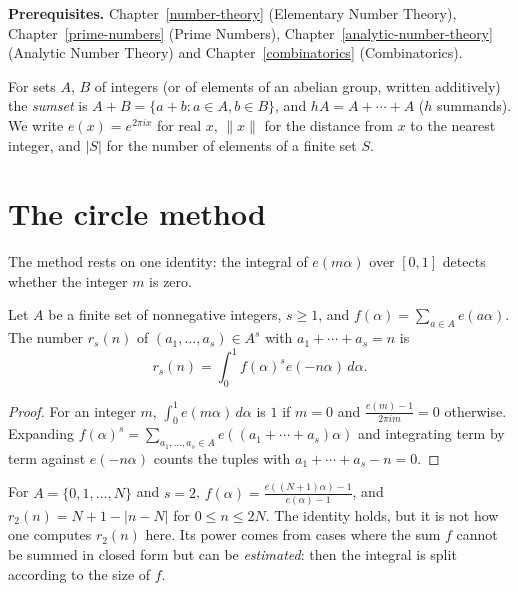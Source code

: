 \noindent\textbf{Prerequisites.} Chapter~\ref{number-theory} (Elementary Number Theory), Chapter~\ref{prime-numbers} (Prime Numbers), Chapter~\ref{analytic-number-theory} (Analytic Number Theory) and
Chapter~\ref{combinatorics} (Combinatorics).

\begin{notation}\label{additive-number-theory:notation-sumsets}
For sets $A$, $B$ of integers (or of elements of an abelian group, written additively) the \emph{sumset} is $A + B = \{a + b : a \in A, b \in B\}$, and $hA = A + \cdots + A$ ($h$ summands). We write
$e(x) = e^{2\pi ix}$ for real $x$, $\|x\|$ for the distance from $x$ to the nearest integer, and $|S|$ for the number of elements of a finite set $S$.
\end{notation}

\section{The circle method}\label{additive-number-theory:section-circle-method}

The method rests on one identity: the integral of $e(m\alpha)$ over $[0, 1]$ detects whether the integer $m$ is zero.

\begin{proposition}\label{additive-number-theory:proposition-circle-identity}
Let $A$ be a finite set of nonnegative integers, $s \geq 1$, and $f(\alpha) = \sum_{a \in A}e(a\alpha)$. The number $r_s(n)$ of $(a_1, \ldots, a_s) \in A^s$ with $a_1 + \cdots + a_s = n$ is
\[
r_s(n) = \int_0^1f(\alpha)^se(-n\alpha)\,d\alpha .
\]
\end{proposition}

\begin{proof}
For an integer $m$, $\int_0^1e(m\alpha)\,d\alpha$ is $1$ if $m = 0$ and $\frac{e(m) - 1}{2\pi im} = 0$ otherwise. Expanding $f(\alpha)^s = \sum_{a_1, \ldots, a_s \in A}e((a_1 + \cdots + a_s)\alpha)$ and integrating term by term
against $e(-n\alpha)$ counts the tuples with $a_1 + \cdots + a_s - n = 0$.
\end{proof}

\begin{example}\label{additive-number-theory:example-circle-identity}
For $A = \{0, 1, \ldots, N\}$ and $s = 2$, $f(\alpha) = \frac{e((N + 1)\alpha) - 1}{e(\alpha) - 1}$, and $r_2(n) = N + 1 - |n - N|$ for $0 \leq n \leq 2N$. The identity holds, but it is not how one computes $r_2(n)$
here. Its power comes from cases where the sum $f$ cannot be summed in closed form but can be \emph{estimated}: then the integral is split according to the size of $f$.
\end{example}

